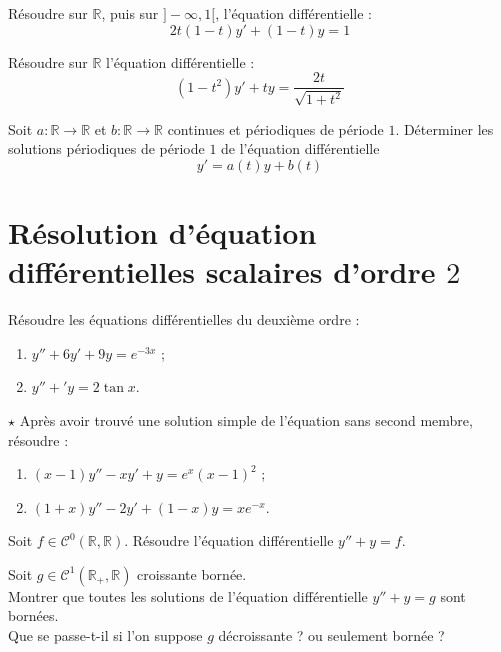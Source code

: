 \documentclass[french,a4paper]{article}
\newcommand{\R}{\mathbb{R}}
\theoremstyle{plain}
\theoremstyle{definition}
\theoremstyle{remark}
\begin{document}
\begin{ex}[Moulin.07]{}
	Résoudre sur $\R$, puis sur $]-\infty,1[$, l'équation différentielle : $$2t(1-t)y'+(1-t)y=1$$
\end{ex}

\begin{ex}[Moulin.08]{}
	Résoudre sur $\R$ l'équation différentielle : $$(1-t^2)y'+ty=\frac{2t}{\sqrt{1+t^2}}$$
\end{ex}

\begin{ex}[Moulin.09]{}
	Soit $a:\R\to\R$ et $b:\R\to\R$ continues et périodiques de période $1$. Déterminer les solutions périodiques de période $1$ de l'équation différentielle $$y'=a(t)y+b(t)$$
\end{ex}

\section{Résolution d'équation différentielles scalaires d'ordre $2$}

\begin{ex}[Moulin.10]{}
	Résoudre les équations différentielles du deuxième ordre :
	\begin{enumerate}
		\item $y''+6y'+9y=e^{-3x}$ ;
		\item $y''+'y=2\tan x$.
	\end{enumerate}
\end{ex}

\begin{ex}[Moulin.11]{$\star$}
	Après avoir trouvé une solution simple de l'équation sans second membre, résoudre :
	\begin{enumerate}
		\item $(x-1)y''-xy'+y=e^{x}(x-1)^2$ ;
		\item $(1+x)y''-2y'+(1-x)y=xe^{-x}$.
	\end{enumerate}
\end{ex}

\begin{ex}[Moulin.12]{}
	Soit $f\in\mathcal{C}^0(\R,\R)$. Résoudre l'équation différentielle $y''+y=f$.
\end{ex}

\begin{ex}[Moulin.13]{}
	Soit $g\in\mathcal{C}^1(\R_+,\R)$ croissante bornée. \\
	Montrer que toutes les solutions de l'équation différentielle $y''+y=g$ sont bornées. \\
	Que se passe-t-il si l'on suppose $g$ décroissante ? ou seulement bornée ?
\end{ex}
\end{document}
